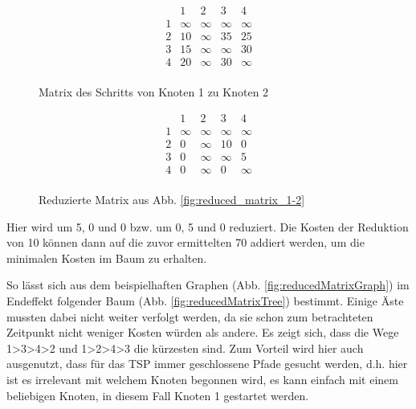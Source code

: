 \begin{figure}[H]
\centering
\begin{minipage}{.5\textwidth}
  \centering
  \[
    \begin{matrix}
          & 1 & 2 & 3 & 4\\
        1 & \infty & \infty & \infty & \infty\\
        2 & 10 & \infty & 35 & 25\\
        3 & 15 & \infty & \infty & 30\\
        4 & 20 & \infty & 30 & \infty\\
    \end{matrix}
    \]
    \caption{Matrix des Schritts von Knoten 1 zu Knoten 2 \cite{geeksForGeeksRm}}
    \label{fig:reduced_matrix_1-2}
\end{minipage}%
\begin{minipage}{.5\textwidth}
  \centering
   \[
    \begin{matrix}
          & 1 & 2 & 3 & 4\\
        1 & \infty & \infty & \infty & \infty\\
        2 & 0 & \infty & 10 & 0\\
        3 & 0 & \infty & \infty & 5\\
        4 & 0 & \infty & 0 & \infty\\
    \end{matrix}
    \]
    \caption{Reduzierte Matrix aus Abb. \ref{fig:reduced_matrix_1-2} \cite{geeksForGeeksRm}}
    \label{fig:reduced_matrix_1-2_reduced}
\end{minipage}
\end{figure}


Hier wird um 5, 0 und 0 bzw. um 0, 5 und 0 reduziert. Die Kosten der Reduktion von 10 können dann auf die zuvor ermittelten 70 addiert werden, um die minimalen Kosten im Baum zu erhalten.


So lässt sich aus dem beispielhaften Graphen (Abb. \ref{fig:reducedMatrixGraph}) im Endeffekt folgender Baum (Abb. \ref{fig:reducedMatrixTree}) bestimmt. Einige Äste mussten dabei nicht weiter verfolgt werden, da sie schon zum betrachteten Zeitpunkt nicht weniger Kosten würden als andere. Es zeigt sich, dass die Wege 1>3>4>2 und 1>2>4>3 die kürzesten sind. Zum Vorteil wird hier auch ausgenutzt, dass für das TSP immer geschlossene Pfade gesucht werden, d.h. hier ist es irrelevant mit welchem Knoten begonnen wird, es kann einfach mit einem beliebigen Knoten, in diesem Fall Knoten 1 gestartet werden. \cite{geeksForGeeksRm}

